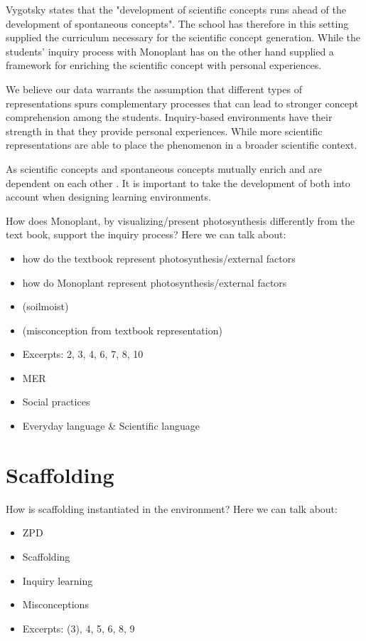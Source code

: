Vygotsky states that the "development of scientific concepts runs ahead of the development of spontaneous concepts". The school has therefore in this setting supplied the curriculum necessary for the scientific concept generation. While the students' inquiry process with Monoplant has on the other hand supplied a framework for enriching the scientific concept with personal experiences.

We believe our data warrants the assumption that different types of representations spurs complementary processes that can lead to stronger concept comprehension among the students. Inquiry-based environments have their strength in that they provide personal experiences. While more scientific representations are able to place the phenomenon in a broader scientific context.  

As scientific concepts and spontaneous concepts mutually enrich and are dependent on each other \citep{vygotsky2012thought}. It is important to take the development of both into account when designing learning environments. 




How does Monoplant, by visualizing/present photosynthesis differently from the text book, support the inquiry process? 
Here we can talk about: 
\begin{itemize}
\item{how do the textbook represent photosynthesis/external factors}
\item{how do Monoplant represent photosynthesis/external factors}
\item{ (soilmoist)}
\item{ (misconception from textbook representation)}
\item{Excerpts: 2, 3, 4, 6, 7, 8, 10}
\item{MER}
\item{Social practices}
\item{Everyday language \& Scientific language}
\end{itemize}




\section{Scaffolding}
How is scaffolding instantiated in the environment?
Here we can talk about: 
\begin{itemize}
\item{ZPD}
\item{Scaffolding}
\item{Inquiry learning}
\item{Misconceptions}
\item{Excerpts: (3), 4, 5, 6, 8, 9}
\end{itemize}



